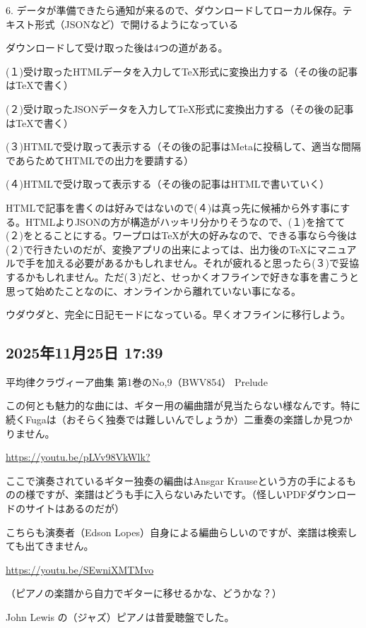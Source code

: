 6. データが準備できたら通知が来るので、ダウンロードしてローカル保存。テキスト形式（JSONなど）で開けるようになっている

ダウンロードして受け取った後は4つの道がある。

(１)受け取ったHTMLデータを入力してTeX形式に変換出力する（その後の記事はTeXで書く）

(２)受け取ったJSONデータを入力してTeX形式に変換出力する（その後の記事はTeXで書く）

(３)HTMLで受け取って表示する（その後の記事はMetaに投稿して、適当な間隔であらためてHTMLでの出力を要請する）

(４)HTMLで受け取って表示する（その後の記事はHTMLで書いていく）

HTMLで記事を書くのは好みではないので(４)は真っ先に候補から外す事にする。HTMLよりJSONの方が構造がハッキリ分かりそうなので、(１)を捨てて(２)をとることにする。ワープロはTeXが大の好みなので、できる事なら今後は(２)で行きたいのだが、変換アプリの出来によっては、出力後のTeXにマニュアルで手を加える必要があるかもしれません。それが疲れると思ったら(３)で妥協するかもしれません。ただ(３)だと、せっかくオフラインで好きな事を書こうと思って始めたことなのに、オンラインから離れていない事になる。

ウダウダと、完全に日記モードになっている。早くオフラインに移行しよう。

\subsection*{2025年11月25日 17:39}

平均律クラヴィーア曲集 第1巻のNo,9（BWV854） Prelude

この何とも魅力的な曲には、ギター用の編曲譜が見当たらない様なんです。特に続くFugaは（おそらく独奏では難しいんでしょうか）二重奏の楽譜しか見つかりません。

\url{https://youtu.be/pLVv98VkWlk?}

ここで演奏されているギター独奏の編曲はAnsgar Krauseという方の手によるものの様ですが、楽譜はどうも手に入らないみたいです。（怪しいPDFダウンロードのサイトはあるのだが）

こちらも演奏者（Edson Lopes）自身による編曲らしいのですが、楽譜は検索しても出てきません。

\url{https://youtu.be/SEwniXMTMvo}

（ピアノの楽譜から自力でギターに移せるかな、どうかな？）

John Lewis の（ジャズ）ピアノは昔愛聴盤でした。

